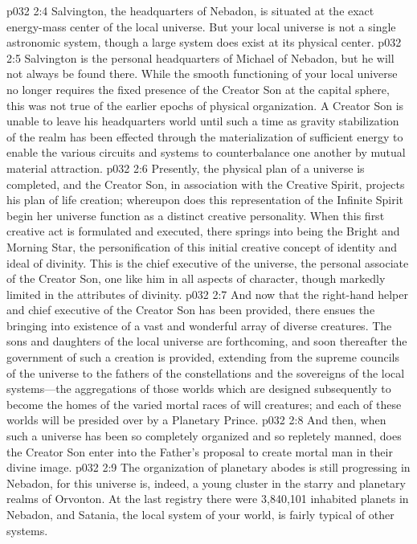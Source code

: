\vs p032 2:4 Salvington, the headquarters of Nebadon, is situated at the exact energy\hyp{}mass center of the local universe. But your local universe is not a single astronomic system, though a large system does exist at its physical center.
\vs p032 2:5 Salvington is the personal headquarters of Michael of Nebadon, but he will not always be found there. While the smooth functioning of your local universe no longer requires the fixed presence of the Creator Son at the capital sphere, this was not true of the earlier epochs of physical organization. A Creator Son is unable to leave his headquarters world until such a time as gravity stabilization of the realm has been effected through the materialization of sufficient energy to enable the various circuits and systems to counterbalance one another by mutual material attraction.
\pc \vs p032 2:6 Presently, the physical plan of a universe is completed, and the Creator Son, in association with the Creative Spirit, projects his plan of life creation; whereupon does this representation of the Infinite Spirit begin her universe function as a distinct creative personality. When this first creative act is formulated and executed, there springs into being the Bright and Morning Star, the personification of this initial creative concept of identity and ideal of divinity. This is the chief executive of the universe, the personal associate of the Creator Son, one like him in all aspects of character, though markedly limited in the attributes of divinity.
\vs p032 2:7 And now that the right\hyp{}hand helper and chief executive of the Creator Son has been provided, there ensues the bringing into existence of a vast and wonderful array of diverse creatures. The sons and daughters of the local universe are forthcoming, and soon thereafter the government of such a creation is provided, extending from the supreme councils of the universe to the fathers of the constellations and the sovereigns of the local systems---the aggregations of those worlds which are designed subsequently to become the homes of the varied mortal races of will creatures; and each of these worlds will be presided over by a Planetary Prince.
\vs p032 2:8 And then, when such a universe has been so completely organized and so repletely manned, does the Creator Son enter into the Father’s proposal to create mortal man in their divine image.
\pc \vs p032 2:9 The organization of planetary abodes is still progressing in Nebadon, for this universe is, indeed, a young cluster in the starry and planetary realms of Orvonton. At the last registry there were 3,840,101 inhabited planets in Nebadon, and Satania, the local system of your world, is fairly typical of other systems.
